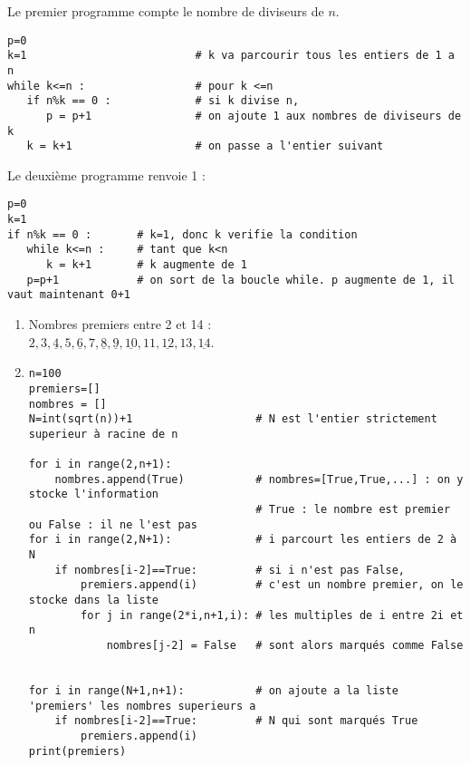 \begin{solution}
Le premier programme compte le nombre de diviseurs de $n$.
\begin{verbatim}
p=0
k=1                          # k va parcourir tous les entiers de 1 a n
while k<=n :                 # pour k <=n     
   if n%k == 0 :             # si k divise n,
      p = p+1                # on ajoute 1 aux nombres de diviseurs de k
   k = k+1                   # on passe a l'entier suivant 
\end{verbatim}
Le deuxi\` eme programme renvoie 1 :
\begin{verbatim}
p=0
k=1
if n%k == 0 :       # k=1, donc k verifie la condition
   while k<=n :     # tant que k<n
      k = k+1       # k augmente de 1
   p=p+1            # on sort de la boucle while. p augmente de 1, il vaut maintenant 0+1
\end{verbatim}
\end{solution}
\bigskip


\begin{solution}
\begin{enumerate}
\item Nombres premiers entre 2 et 14 :\\
$2, 3, \underline{4},5,\underline{6},7,\underline{8},\underline{9},\underline{10},11,\underline{12},13,\underline{14}$. 
\item \begin{verbatim}
n=100
premiers=[]
nombres = []
N=int(sqrt(n))+1                   # N est l'entier strictement superieur à racine de n

for i in range(2,n+1):
    nombres.append(True)           # nombres=[True,True,...] : on y stocke l'information 
                                   # True : le nombre est premier ou False : il ne l'est pas
for i in range(2,N+1):             # i parcourt les entiers de 2 à N
    if nombres[i-2]==True:         # si i n'est pas False, 
        premiers.append(i)         # c'est un nombre premier, on le stocke dans la liste
        for j in range(2*i,n+1,i): # les multiples de i entre 2i et n
            nombres[j-2] = False   # sont alors marqués comme False
                                   
            
for i in range(N+1,n+1):           # on ajoute a la liste 'premiers' les nombres superieurs a 
    if nombres[i-2]==True:         # N qui sont marqués True   
        premiers.append(i)             
print(premiers)
\end{verbatim}
\end{enumerate}
\end{solution}














